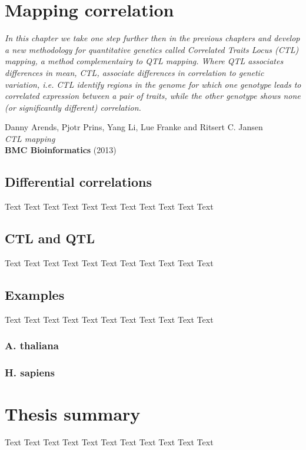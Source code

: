 \documentclass[8pt, twoside, a5paper]{report}
\newenvironment{myexampleblock}[1]{%
    \tcolorbox[beamer,%
    noparskip,breakable,
    colback=LightGreen,colframe=DarkGreen,%
    colbacklower=LimeGreen!75!LightGreen,%
    title=#1]}%
    {\endtcolorbox}
\newcommand{\authors}[1]{\small{#1}}
\newcommand{\bold}[1]{{\bfseries #1}}
\begin{document}
\chapter{Mapping correlation}

\emph{In this chapter we take one step further then in the previous chapters and develop a new methodology for
quantitative genetics called Correlated Traits Locus (CTL) mapping, a method complementairy to QTL mapping. 
Where QTL associates differences in mean, CTL, associate differences in correlation to genetic variation, i.e. 
CTL identify regions in the genome for which one genotype leads to correlated expression between a pair of 
traits, while the other genotype shows none (or significantly different) correlation.}

\null
\vfill

\begin{myexampleblock}{In press:}
  \authors{Danny Arends, Pjotr Prins, Yang Li, Lue Franke and Ritsert C. Jansen}\\
  \emph{CTL mapping}\\
  \bold{BMC Bioinformatics} (2013)
\end{myexampleblock}

\newpage

\section{Differential correlations}
Text Text Text Text Text Text Text Text Text Text Text

\section{CTL and QTL}
Text Text Text Text Text Text Text Text Text Text Text

\section{Examples}
Text Text Text Text Text Text Text Text Text Text Text
\subsection{A. thaliana}

\subsection{H. sapiens}

\chapter{Thesis summary}
Text Text Text Text Text Text Text Text Text Text Text
\end{document}
